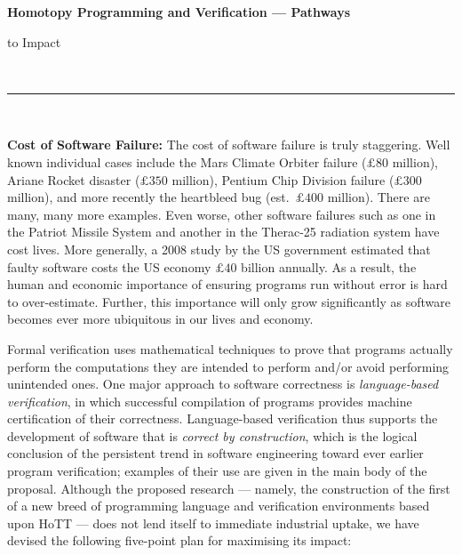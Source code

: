\documentclass[a4paper,11pt]{article}
\begin{document}
\thispagestyle{plain}

\begin{center}

  {\Large {\bf Homotopy Programming and Verification --- Pathways

      to Impact}}\\[1ex]   



\vspace*{-0.1in}



  \rule{150mm}{.5mm}\\[2ex]

\end{center}



\noindent



\vspace*{-0.1in}

{\bf Cost of Software Failure:} The cost of software failure is truly
staggering. Well known individual cases include the Mars Climate
Orbiter failure ($\pounds 80$ million), Ariane Rocket disaster
($\pounds 350$ million), Pentium Chip Division failure ($\pounds 300$
million), and more recently the heartbleed bug (est.\ $\pounds 400$ million). There are many, many more examples. Even worse, other
software failures such as one in the Patriot Missile System and
another in the Therac-25 radiation system have cost lives. More
generally, a 2008 study by the US government estimated that faulty
software costs the US economy $\pounds 40$ billion annually.  As a
result, the human and economic importance of ensuring programs run
without error is hard to over-estimate. Further, this importance will
only grow significantly as software becomes ever more ubiquitous in
our lives and economy.

Formal verification uses mathematical techniques to prove that
programs actually perform the computations they are intended to
perform and/or avoid performing unintended ones. One major approach to
software correctness is {\em language-based verification}, in which
successful compilation of programs provides machine certification of
their correctness. Language-based verification thus supports the
development of software that is {\em correct by construction}, which
is the logical conclusion of the persistent trend in software
engineering toward ever earlier program verification; examples of
their use are given in the main body of the proposal. Although the
proposed research --- namely, the construction of the first of a new
breed of programming language and verification environments based upon
HoTT --- does not lend itself to immediate industrial uptake, we have
devised the following five-point plan for maximising its impact:
\end{document}
